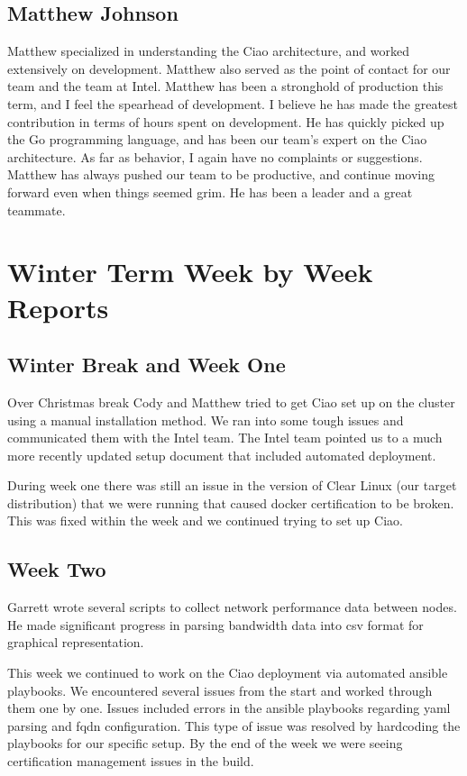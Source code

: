 \documentclass[10pt,onecolumn,journal,draftclsnofoot]{IEEEtran}
\begin{document}
\subsection{Matthew Johnson}
Matthew specialized in understanding the Ciao architecture, and worked extensively
on development. Matthew also served as the point of contact for our team and
the team at Intel. Matthew has been a stronghold of production this term, and
I feel the spearhead of development. I believe he has made the greatest contribution
in terms of hours spent on development. He has quickly picked up the Go programming
language, and has been our team's expert on the Ciao architecture. As far as
behavior, I again have no complaints or suggestions. Matthew has always pushed
our team to be productive, and continue moving forward even when things seemed
grim. He has been a leader and a great teammate. 

\section{Winter Term Week by Week Reports}
\subsection{Winter Break and Week One}

Over Christmas break Cody and Matthew tried to get Ciao set up on the cluster
using a manual installation method. We ran into some tough issues and
communicated them with the Intel team. The Intel team pointed us to a much more
recently updated setup document that included automated deployment.

During week one there was still an issue in the version of Clear Linux (our
target distribution) that we were running that caused docker certification to be
broken. This was fixed within the week and we continued trying to set up Ciao.

\subsection{Week Two}

Garrett wrote several scripts to collect network performance data between nodes.
He made significant progress in parsing bandwidth data into csv format for
graphical representation.

This week we continued to work on the Ciao deployment via automated ansible
playbooks. We encountered several issues from the start and worked through
them one by one. Issues included errors in the ansible playbooks regarding yaml
parsing and fqdn configuration. This type of issue was resolved by hardcoding
the playbooks for our specific setup. By the end of the week we were seeing
certification management issues in the build.
\end{document}
